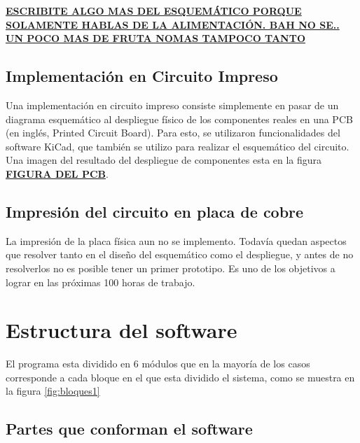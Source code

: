 \documentclass{article}
\theoremstyle{definition}
\theoremstyle{remark}
\begin{document}
\textbf{\underline{ESCRIBITE ALGO MAS DEL ESQUEMÁTICO PORQUE SOLAMENTE HABLAS DE LA ALIMENTACIÓN. BAH NO SE.. UN POCO MAS DE FRUTA NOMAS TAMPOCO TANTO}}




\subsection{Implementación en Circuito Impreso} %
\label{sub:implementacion_en_circuito_impreso}

Una implementación en circuito impreso consiste simplemente en pasar de un diagrama esquemático al despliegue físico de los componentes reales en una PCB (en inglés, Printed Circuit Board). Para esto, se utilizaron funcionalidades del software KiCad, que también se utilizo para realizar el esquemático del circuito. Una imagen del resultado del despliegue de componentes esta en la figura \textbf{\underline{FIGURA DEL PCB}}.


\subsection{Impresión del circuito en placa de cobre} %
\label{sub:impresion_del_circuito_en_placa_de_cobre}

La impresión de la placa física aun no se implemento. Todavía quedan aspectos que resolver tanto en el diseño del esquemático como el despliegue, y antes de no resolverlos no es posible tener un primer prototipo. Es uno de los objetivos a lograr en las próximas 100 horas de trabajo.





\section{Estructura del software} %
\label{sec:estructura_del_software}

El programa esta dividido en 6 módulos que en la mayoría de los casos corresponde a cada bloque en el que esta dividido el sistema, como se muestra en la figura \ref{fig:bloques1}

\subsection{Partes que conforman el software} %
\label{sub:partes_que_conforman_el_software}
\end{document}
